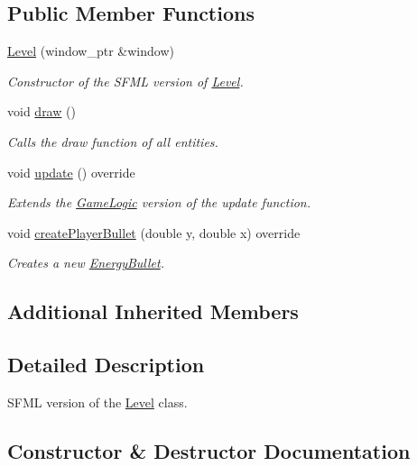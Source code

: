 \subsection*{Public Member Functions}
\begin{DoxyCompactItemize}
\item 
\hyperlink{classGameSFML_1_1Level_a68fb7b46bb5fde22cf16f6530d63efa7}{Level} (window\+\_\+ptr \&window)
\begin{DoxyCompactList}\small\item\em Constructor of the S\+F\+ML version of \hyperlink{classGameSFML_1_1Level}{Level}. \end{DoxyCompactList}\item 
void \hyperlink{classGameSFML_1_1Level_a102b4f351a97cde5a71a473b15126847}{draw} ()
\begin{DoxyCompactList}\small\item\em Calls the draw function of all entities. \end{DoxyCompactList}\item 
void \hyperlink{classGameSFML_1_1Level_ab98f7a9ceb040bef609c2c96990707ba}{update} () override
\begin{DoxyCompactList}\small\item\em Extends the \hyperlink{namespaceGameLogic}{Game\+Logic} version of the update function. \end{DoxyCompactList}\item 
void \hyperlink{classGameSFML_1_1Level_adafff50ab250a1d85f1b1d48c085bac1}{create\+Player\+Bullet} (double y, double x) override
\begin{DoxyCompactList}\small\item\em Creates a new \hyperlink{classGameSFML_1_1EnergyBullet}{Energy\+Bullet}. \end{DoxyCompactList}\end{DoxyCompactItemize}
\subsection*{Additional Inherited Members}


\subsection{Detailed Description}
S\+F\+ML version of the \hyperlink{classGameSFML_1_1Level}{Level} class. 

\subsection{Constructor \& Destructor Documentation}
\mbox{\label{classGameSFML_1_1Level_a68fb7b46bb5fde22cf16f6530d63efa7}} 

